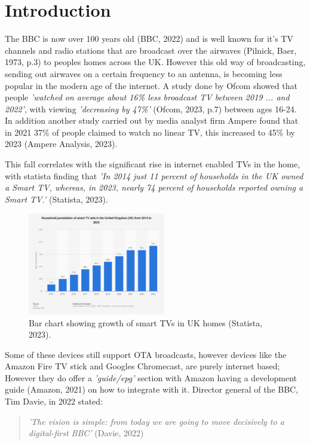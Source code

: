 \section{Introduction}

  The BBC is now over 100 years old (BBC, 2022) and is well known for it's TV channels and radio stations that are broadcast over the airwaves (Pilnick, Baer, 1973, p.3) 
  to peoples homes across the UK. However this old way of broadcasting, sending out airwaves on a certain frequency to an antenna, is becoming 
  less popular in the modern age of the internet. A study done by Ofcom showed that people
  \textit{'watched on average about 16\% less broadcast TV between 2019 ... and 2022'}, with viewing \textit{'decreasing by 47\%'} (Ofcom, 2023, p.7) between ages
  16-24. In addition another study carried out by media analyst firm Ampere found that in 2021 37\% of people claimed to watch no linear TV,
  this increased to 45\% by 2023 (Ampere Analysis, 2023).
  
  This fall correlates with the significant rise in internet enabled TVs in the home, with statista finding that 
  \textit{'In 2014 just 11 percent of households in the UK owned a Smart TV, whereas, in 2023, nearly 74 percent of households reported owning a Smart TV.'} (Statista, 2023).

  \begin{figure}[H]
    \centering
    \includegraphics[width=6cm]{assets/smartTvGrowth.png}
    \caption{Bar chart showing growth of smart TVs in UK homes (Statista, 2023).}
    \label{fig:smartTvGrowth}
  \end{figure}

  Some of these devices still support OTA broadcasts, however devices like the Amazon Fire TV stick and Googles Chromecast, are purely internet
  based; However they do offer a \textit{'guide/epg'} section with Amazon having a development guide (Amazon, 2021) on how to integrate with it.
  Director general of the BBC, Tim Davie, in 2022 stated:
    \begin{quote}
      \textit{'The vision is simple: from today we are going to move decisively to  a digital-first BBC'} (Davie, 2022)
    \end{quote}

